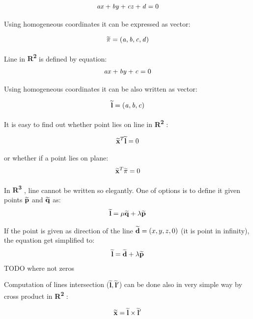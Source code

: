\documentclass[a4paper,12pt]{report}
\newcommand{\ehvect}[1]{
{\bf \widetilde{#1}}
}
\newcommand{\escal}[1]{
{\it #1}
}
\newcommand{\eucl}[1]{
{\bf R\textsuperscript{#1}}
}
\begin{document}
\begin{equation}
\escal{a}\escal{x} + \escal{b}\escal{y} + \escal{c}\escal{z} + \escal{d} = 0
\end{equation}

Using homogeneous coordinates it can be expressed as vector:

\begin{equation}
\ehvect{\pi} =  (\escal{a}, \escal{b}, \escal{c}, \escal{d})
\end{equation}


Line in \eucl{2} is defined by equation:
\begin{equation}
\escal{a}\escal{x} + \escal{b}\escal{y} + \escal{c} = 0
\end{equation}

Using homogeneous coordinates it can be also written as vector:

\begin{equation}
\ehvect{l} =  (\escal{a}, \escal{b}, \escal{c})
\end{equation}

It is easy to find out whether point lies on line in \eucl{2}:

\begin{equation}
\ehvect{x}^{T} \ehvect{l} = 0
\end{equation}

or whether if a point lies on plane:
\begin{equation}
\ehvect{x}^{T} \ehvect{\pi} = 0
\end{equation}


In \eucl{3}, line cannot be written so elegantly.
One of options is to define it given points $\ehvect{p}$ and $\ehvect{q}$ as:
\begin{equation}
 \ehvect{l} = \escal{\mu}\ehvect{q} + \escal{\lambda}\ehvect{p}
\end{equation}

If the point is given as direction of the line $\ehvect{d} = (x, y, z, 0)$ (it is point in infinity), the equation get simplified to:
\begin{equation}
\ehvect{l} = \ehvect{d} + \escal{\lambda}\ehvect{p} \label{eq:hline}
\end{equation}
TODO where not zeros

Computation of lines intersection ($\ehvect{l}, \ehvect{l}'$) can be done also in very simple way by cross product in \eucl{2}:

\begin{equation}
\ehvect{x} = \ehvect{l} \times \ehvect{l}' \label{eq:def_hline_pts}
\end{equation}
\end{document}
